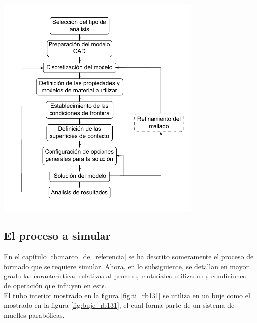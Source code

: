 \begin{center}
\includegraphics[width=0.75\textwidth]{src/ch3/metodologia_analisis_fem.pdf}
\label{fig:metodologia_analisis_fem}
\end{center}

\subsection{El proceso a simular}

En el capítulo \ref{ch:marco_de_referencia} se ha descrito someramente el proceso de formado que se requiere 
simular. Ahora, en lo subsiguiente, se detallan en mayor grado las características 
relativas al proceso, materiales utilizados y condiciones de operación que influyen en este. \\

El tubo interior mostrado en la figura \ref{fig:ti_rb131} se utiliza en un buje como 
el mostrado en la figura \ref{fig:buje_rb131}, el cual forma parte de un sistema de muelles 
parabólicas.

